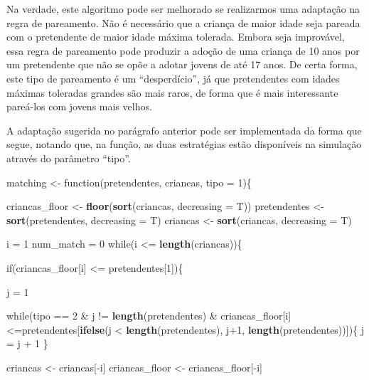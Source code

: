 \documentclass[]{book}
\newenvironment{Shaded}{\begin{snugshade}}{\end{snugshade}}
\newcommand{\KeywordTok}[1]{\textcolor[rgb]{0.13,0.29,0.53}{\textbf{{#1}}}}
\newcommand{\DataTypeTok}[1]{\textcolor[rgb]{0.13,0.29,0.53}{{#1}}}
\newcommand{\DecValTok}[1]{\textcolor[rgb]{0.00,0.00,0.81}{{#1}}}
\newcommand{\StringTok}[1]{\textcolor[rgb]{0.31,0.60,0.02}{{#1}}}
\newcommand{\NormalTok}[1]{{#1}}
\begin{document}
Na verdade, este algoritmo pode ser melhorado se realizarmos uma
adaptação na regra de pareamento. Não é necessário que a criança de
maior idade seja pareada com o pretendente de maior idade máxima
tolerada. Embora seja improvável, essa regra de pareamento pode produzir
a adoção de uma criança de 10 anos por um pretendente que não se opõe a
adotar jovens de até 17 anos. De certa forma, este tipo de pareamento é
um ``desperdício'', já que pretendentes com idades máximas toleradas
grandes são mais raros, de forma que é mais interessante pareá-los com
jovens mais velhos.

A adaptação sugerida no parágrafo anterior pode ser implementada da
forma que segue, notando que, na função, as duas estratégias estão
disponíveis na simulação através do parâmetro ``tipo''.

\begin{Shaded}
\begin{Highlighting}[]
\NormalTok{matching <-}\StringTok{ }\NormalTok{function(pretendentes, criancas, }\DataTypeTok{tipo =} \DecValTok{1}\NormalTok{)\{}

  \NormalTok{criancas_floor <-}\StringTok{ }\KeywordTok{floor}\NormalTok{(}\KeywordTok{sort}\NormalTok{(criancas, }\DataTypeTok{decreasing =} \NormalTok{T))}
  \NormalTok{pretendentes <-}\StringTok{ }\KeywordTok{sort}\NormalTok{(pretendentes, }\DataTypeTok{decreasing =} \NormalTok{T)}
  \NormalTok{criancas <-}\StringTok{ }\KeywordTok{sort}\NormalTok{(criancas, }\DataTypeTok{decreasing =} \NormalTok{T)}

  \NormalTok{i =}\StringTok{ }\DecValTok{1}
  \NormalTok{num_match =}\StringTok{ }\DecValTok{0}
  \NormalTok{while(i <=}\StringTok{ }\KeywordTok{length}\NormalTok{(criancas))\{}

    \NormalTok{if(criancas_floor[i] <=}\StringTok{ }\NormalTok{pretendentes[}\DecValTok{1}\NormalTok{])\{}

      \NormalTok{j =}\StringTok{ }\DecValTok{1}

      \NormalTok{while(tipo ==}\StringTok{ }\DecValTok{2} \NormalTok{&}\StringTok{ }\NormalTok{j !=}\StringTok{ }\KeywordTok{length}\NormalTok{(pretendentes) &}\StringTok{ }\NormalTok{criancas_floor[i]<=pretendentes[}\KeywordTok{ifelse}\NormalTok{(j <}\StringTok{ }\KeywordTok{length}\NormalTok{(pretendentes), j}\DecValTok{+1}\NormalTok{, }\KeywordTok{length}\NormalTok{(pretendentes))])\{}
        \NormalTok{j =}\StringTok{ }\NormalTok{j +}\StringTok{ }\DecValTok{1}
      \NormalTok{\}}

      \NormalTok{criancas <-}\StringTok{ }\NormalTok{criancas[-i]}
      \NormalTok{criancas_floor <-}\StringTok{ }\NormalTok{criancas_floor[-i]}


\end{Highlighting}
\end{Shaded}
\end{document}
